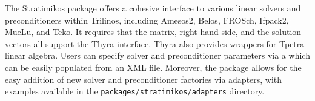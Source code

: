 The Stratimikos package offers a cohesive interface to various linear solvers and preconditioners within Trilinos, including Amesos2, Belos, FROSch, Ifpack2, MueLu, and Teko.
It requires that the matrix, right-hand side, and the solution vectors all support the Thyra interface.
Thyra also provides wrappers for Tpetra linear algebra.
Users can specify solver and preconditioner parameters via a 
which can be easily populated from an XML file.
Moreover, the package allows for the easy addition of new solver and preconditioner factories via adapters, with examples available in the \texttt{packages/stratimikos/adapters} directory.
